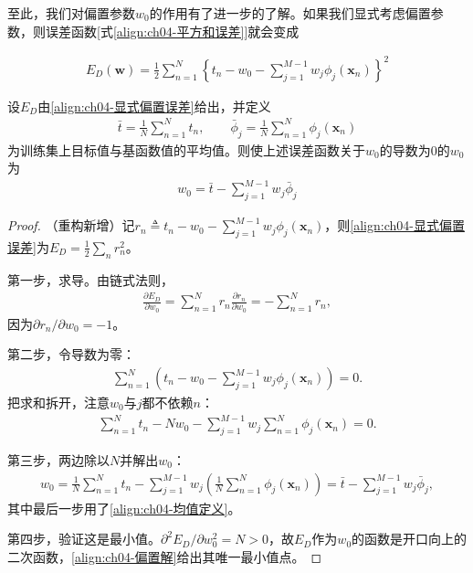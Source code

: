 \documentclass[../../main.tex]{subfiles}
\begin{document}
至此，我们对偏置参数$w_0$的作用有了进一步的了解。如果我们显式考虑偏置参数，则误差函数[式\eqref{align:ch04-平方和误差}]就会变成

\begin{align}
  E_D(\boldsymbol{w})=\frac{1}{2}\sum_{n=1}^{N}\left\{t_n-w_0-\sum_{j=1}^{M-1}w_j\phi_j(\boldsymbol{x}_n)\right\}^2
  \label{align:ch04-显式偏置误差}
\end{align}

\begin{proposition}[偏置参数的显式解]\label{proposition:ch04-偏置解}
设$E_D$由\eqref{align:ch04-显式偏置误差}给出，并定义
\begin{align}
  \bar{t}=\frac{1}{N}\sum_{n=1}^{N}t_n,\qquad
  \bar{\phi}_j=\frac{1}{N}\sum_{n=1}^{N}\phi_j(\boldsymbol{x}_n)
  \label{align:ch04-均值定义}
\end{align}
为训练集上目标值与基函数值的平均值。则使上述误差函数关于$w_0$的导数为$0$的$w_0$为
\begin{align}
  w_0=\bar{t}-\sum_{j=1}^{M-1}w_j\bar{\phi}_j
  \label{align:ch04-偏置解}
\end{align}
\end{proposition}

\begin{proof}
（重构新增）记$r_n\triangleq t_n-w_0-\sum_{j=1}^{M-1}w_j\phi_j(\boldsymbol{x}_n)$，则\eqref{align:ch04-显式偏置误差}为$E_D=\frac{1}{2}\sum_n r_n^2$。

第一步，求导。由链式法则，
\begin{align*}
  \frac{\partial E_D}{\partial w_0}=\sum_{n=1}^{N}r_n\frac{\partial r_n}{\partial w_0}=-\sum_{n=1}^{N}r_n,
\end{align*}
因为$\partial r_n/\partial w_0=-1$。

第二步，令导数为零：
\begin{align*}
  \sum_{n=1}^{N}\left(t_n-w_0-\sum_{j=1}^{M-1}w_j\phi_j(\boldsymbol{x}_n)\right)=0.
\end{align*}
把求和拆开，注意$w_0$与$j$都不依赖$n$：
\begin{align*}
  \sum_{n=1}^{N}t_n-Nw_0-\sum_{j=1}^{M-1}w_j\sum_{n=1}^{N}\phi_j(\boldsymbol{x}_n)=0.
\end{align*}

第三步，两边除以$N$并解出$w_0$：
\begin{align*}
  w_0=\frac{1}{N}\sum_{n=1}^{N}t_n-\sum_{j=1}^{M-1}w_j\left(\frac{1}{N}\sum_{n=1}^{N}\phi_j(\boldsymbol{x}_n)\right)=\bar{t}-\sum_{j=1}^{M-1}w_j\bar{\phi}_j,
\end{align*}
其中最后一步用了\eqref{align:ch04-均值定义}。

第四步，验证这是最小值。$\partial^2E_D/\partial w_0^2=N>0$，故$E_D$作为$w_0$的函数是开口向上的二次函数，\eqref{align:ch04-偏置解}给出其唯一最小值点。
\end{proof}
\end{document}
